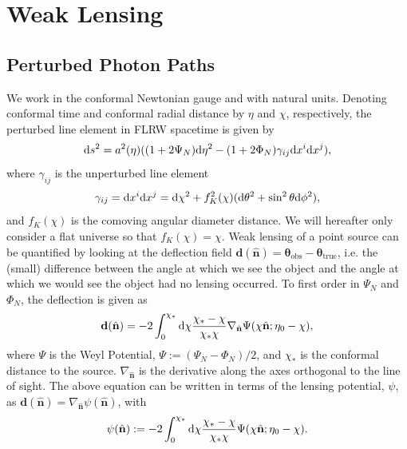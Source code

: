 \documentclass[11pt]{article} %
\DeclareRobustCommand{\d}{\ifmmode\text{d}\else d\fi}
\begin{document}
\printbibliography

\appendix

\section{Weak Lensing}\label{sec:weaklensing}
\subsection{Perturbed Photon Paths}
We work in the conformal Newtonian gauge and with natural units. Denoting conformal time and conformal radial distance by $\eta$ and $\chi$, respectively, the perturbed line element in FLRW spacetime is given by
\begin{equation}
    \d s^2 = a^2(\eta)((1 + 2\Psi_N) \d \eta^2 - (1 + 2\Phi_N) \gamma_{ij}\d x^i \d x^j),
\end{equation}
where $\gamma_{ij}$ is the unperturbed line element
\begin{equation}
    \gamma_{ij} = \d x^i \d x^j = \d \chi^2 + f^2_K(\chi)(\d \theta^2 + \sin ^2 \theta \d \phi ^2),
\end{equation}
and $f_K(\chi)$ is the comoving angular diameter distance. We will hereafter only consider a flat universe so that $f_K(\chi) = \chi$. Weak lensing of a point source can be quantified by looking at the deflection field $\mathbf d (\hat{\mathbf n}) = \mathbf \theta_{\text{obs}} - \mathbf \theta_{\text{true}}$, i.e. the (small) difference between the angle at which we see the object and the angle at which we would see the object had no lensing occurred. To first order in $\Psi_N$ and $\Phi_N$, the deflection is given as \cite{dodelson2020modern}
\begin{equation}
    \mathbf d(\hat{\mathbf n}) = -2 \int_0^{\chi_*}\d \chi \frac{\chi_* - \chi}{\chi_*\chi}\nabla_{\hat{\mathbf n}}\Psi(\chi\hat{\mathbf n};\eta_0 - \chi),
\end{equation}
where $\Psi$ is the Weyl Potential, $\Psi := (\Psi_N - \Phi_N)/2$, and $\chi_*$ is the conformal distance to the source. $\nabla_{\hat{\mathbf n}}$ is the derivative along the axes orthogonal to the line of sight. The above equation can be written in terms of the lensing potential, $\psi$, as $\mathbf d (\hat{\mathbf n}) = \nabla_{\hat{\mathbf n}} \psi(\hat{\mathbf n})$, with
\begin{equation}
    \psi(\hat {\mathbf n}) := -2 \int_0^{\chi_*}\d \chi \frac{\chi_* - \chi}{\chi_*\chi}\Psi(\chi\hat{\mathbf n};\eta_0 - \chi).
\end{equation}
\end{document}
